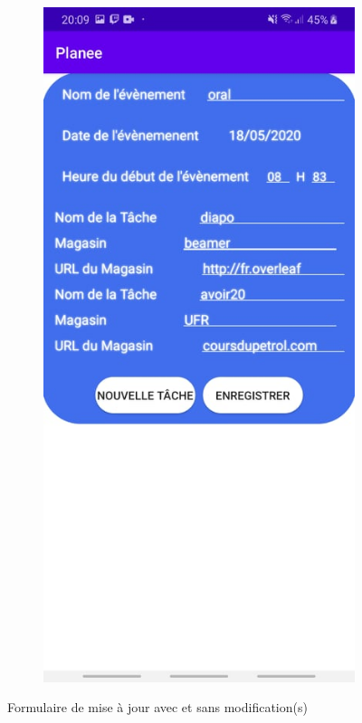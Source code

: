 \documentclass[12pt,a4paper]{report}
\begin{document}
\begin{flushleft}
\begin{figure}[!h]
\begin{subfigure}[b]{0.3\textwidth}
    \end{subfigure}
    \begin{subfigure}[b]{0.3\textwidth}
        \includegraphics[width=\textwidth]{FormUpdateModif}
    \end{subfigure}
    \caption{Formulaire de mise à jour avec et sans modification(s)}
\end{figure}
\end{flushleft}
\newpage
\end{document}
